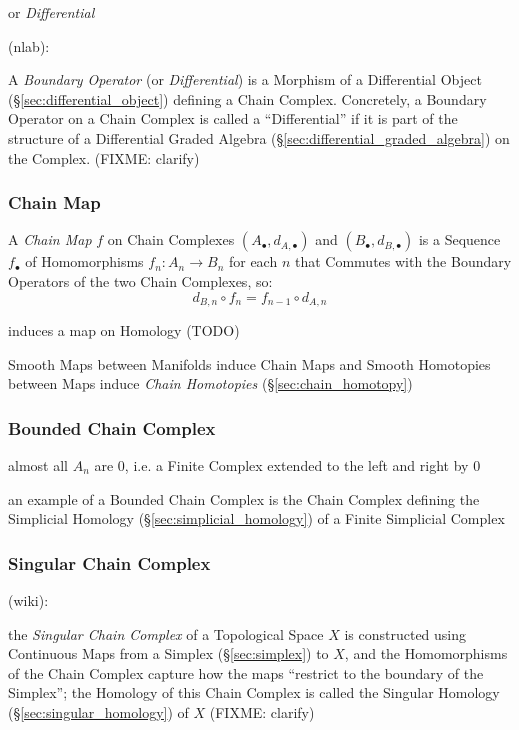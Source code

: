 or \emph{Differential}

(nlab):

A \emph{Boundary Operator} (or \emph{Differential}) is a Morphism of a
Differential Object (\S\ref{sec:differential_object}) defining a Chain Complex.
Concretely, a Boundary Operator on a Chain Complex is called a ``Differential''
if it is part of the structure of a Differential Graded Algebra
(\S\ref{sec:differential_graded_algebra}) on the Complex.
(FIXME: clarify)



\subsubsection{Chain Map}\label{sec:chain_map}

A \emph{Chain Map} $f$ on Chain Complexes $(A_\bullet, d_{A,\bullet})$ and
$(B_\bullet, d_{B,\bullet})$ is a Sequence $f_\bullet$ of Homomorphisms $f_n :
A_n \rightarrow B_n$ for each $n$ that Commutes with the Boundary Operators of
the two Chain Complexes, so:
\[
  d_{B,n} \circ f_n = f_{n-1} \circ d_{A,n}
\]

induces a map on Homology (TODO)

Smooth Maps between Manifolds induce Chain Maps and Smooth Homotopies between
Maps induce \emph{Chain Homotopies} (\S\ref{sec:chain_homotopy})



\subsubsection{Bounded Chain Complex}\label{sec:bounded_chain_complex}

almost all $A_n$ are $0$, i.e. a Finite Complex extended to the left and right
by $0$

an example of a Bounded Chain Complex is the Chain Complex defining the
Simplicial Homology (\S\ref{sec:simplicial_homology}) of a Finite Simplicial
Complex



\subsubsection{Singular Chain Complex}\label{sec:singular_chain_complex}

(wiki):

the \emph{Singular Chain Complex} of a Topological Space $X$ is constructed
using Continuous Maps from a Simplex (\S\ref{sec:simplex}) to $X$, and the
Homomorphisms of the Chain Complex capture how the maps ``restrict to the
boundary of the Simplex''; the Homology of this Chain Complex is called the
Singular Homology (\S\ref{sec:singular_homology}) of $X$ (FIXME: clarify)

